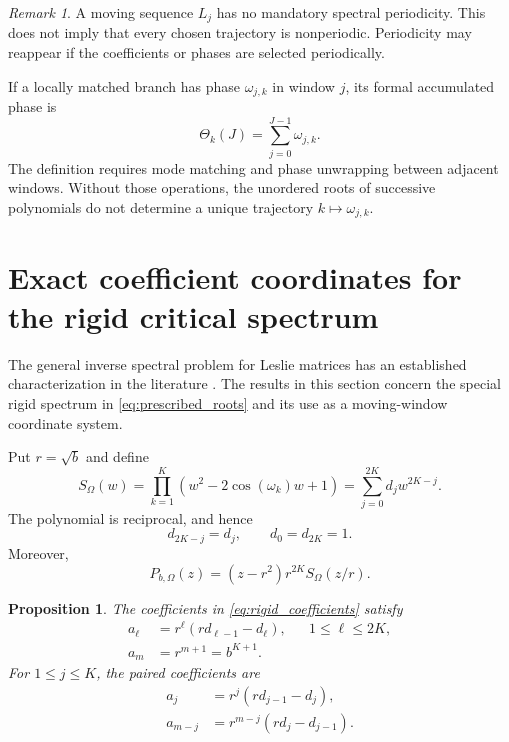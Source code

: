 \documentclass[11pt]{amsart}
\numberwithin{equation}{section}
\theoremstyle{plain}
\newtheorem{proposition}[theorem]{Proposition}
\theoremstyle{definition}
\theoremstyle{remark}
\newtheorem{remark}[theorem]{Remark}
\begin{document}
\begin{remark}
\label{rem:no_forced_periodicity}
A moving sequence $L_j$ has no mandatory spectral periodicity.  This does not imply that every chosen trajectory is nonperiodic.  Periodicity may reappear if the coefficients or phases are selected periodically.
\end{remark}

If a locally matched branch has phase $\omega_{j,k}$ in window $j$, its formal accumulated phase is
\begin{equation}
\Theta_k(J)=\sum_{j=0}^{J-1}\omega_{j,k}.
\label{eq:accumulated_phase}
\end{equation}
The definition requires mode matching and phase unwrapping between adjacent windows.  Without those operations, the unordered roots of successive polynomials do not determine a unique trajectory $k\mapsto\omega_{j,k}$.

\section{Exact coefficient coordinates for the rigid critical spectrum}
\label{sec:eta_coordinates}

The general inverse spectral problem for Leslie matrices has an established characterization in the literature \cite{Benvenuti2019}.  The results in this section concern the special rigid spectrum in \eqref{eq:prescribed_roots} and its use as a moving-window coordinate system.

Put $r=\sqrt b$ and define
\begin{equation}
S_\Omega(w)
=\prod_{k=1}^{K}\left(w^2-2\cos(\omega_k)w+1\right)
=\sum_{j=0}^{2K}d_jw^{2K-j}.
\label{eq:unit_circle_factor}
\end{equation}
The polynomial is reciprocal, and hence
\begin{equation}
d_{2K-j}=d_j,
\qquad
d_0=d_{2K}=1.
\label{eq:palindromic_d}
\end{equation}
Moreover,
\begin{equation}
P_{b,\Omega}(z)
=(z-r^2)r^{2K}S_\Omega(z/r).
\label{eq:scaled_rigid_polynomial}
\end{equation}

\begin{proposition}
\label{prop:coefficient_formula}
The coefficients in \eqref{eq:rigid_coefficients} satisfy
\begin{align}
a_\ell
&=r^\ell\left(rd_{\ell-1}-d_\ell\right),
&&1\leq\ell\leq2K,
\label{eq:coefficient_formula_main}\\
a_m&=r^{m+1}=b^{K+1}.
\label{eq:last_coefficient_fixed}
\end{align}
For $1\leq j\leq K$, the paired coefficients are
\begin{align}
a_j
&=r^j\left(rd_{j-1}-d_j\right),
\label{eq:left_paired_coefficient}\\
a_{m-j}
&=r^{m-j}\left(rd_j-d_{j-1}\right).
\label{eq:right_paired_coefficient}
\end{align}
\end{proposition}
\end{document}
